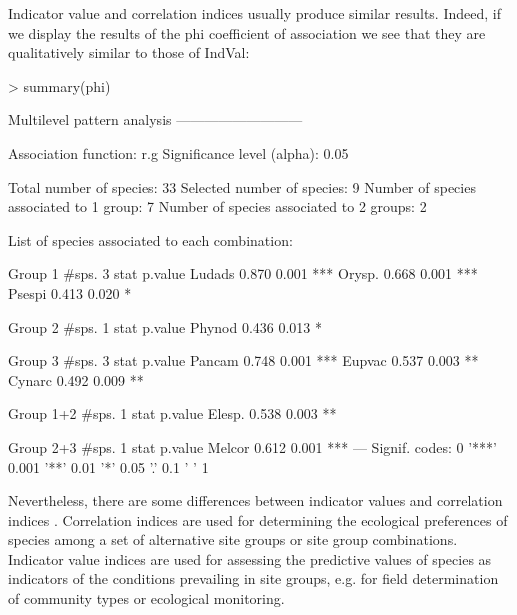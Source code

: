 \documentclass[11pt,a4paper]{article}
\begin{document}
Indicator value and correlation indices usually produce similar results. Indeed, if we display the results of the phi coefficient of association we see that they are qualitatively similar to those of IndVal: 
\begin{Schunk}
\begin{Sinput}
> summary(phi)
\end{Sinput}
\begin{Soutput}
 Multilevel pattern analysis
 ---------------------------

 Association function: r.g
 Significance level (alpha): 0.05

 Total number of species: 33
 Selected number of species: 9 
 Number of species associated to 1 group: 7 
 Number of species associated to 2 groups: 2 

 List of species associated to each combination: 

 Group 1  #sps.  3 
        stat p.value    
Ludads 0.870   0.001 ***
Orysp. 0.668   0.001 ***
Psespi 0.413   0.020 *  

 Group 2  #sps.  1 
        stat p.value  
Phynod 0.436   0.013 *

 Group 3  #sps.  3 
        stat p.value    
Pancam 0.748   0.001 ***
Eupvac 0.537   0.003 ** 
Cynarc 0.492   0.009 ** 

 Group 1+2  #sps.  1 
        stat p.value   
Elesp. 0.538   0.003 **

 Group 2+3  #sps.  1 
        stat p.value    
Melcor 0.612   0.001 ***
---
Signif. codes:  0 '***' 0.001 '**' 0.01 '*' 0.05 '.' 0.1 ' ' 1 
\end{Soutput}
\end{Schunk}
Nevertheless, there are some differences between indicator values and correlation indices \citep{DeCaceres2008}\citep{DeCaceres2009}. Correlation indices are used for determining the ecological preferences of species among a set of alternative site groups or site group combinations. Indicator value indices are used for assessing the predictive values of species as indicators of the conditions prevailing in site groups, e.g. for field determination of community types or ecological monitoring.
\end{document}
